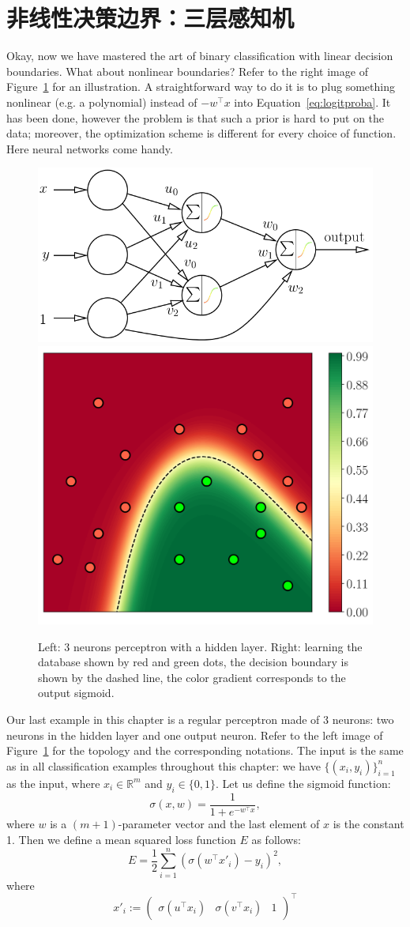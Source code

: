 \documentclass[notitlepage,oneside]{book}
\begin{document}
\section{非线性决策边界：三层感知机}
\label{sec:NN}
Okay, now we have mastered the art of binary classification with linear decision boundaries.
What about nonlinear boundaries? Refer to the right image of Figure~\ref{fig:neural} for an illustration.
A straightforward way to do it is to plug something nonlinear (e.g. a polynomial) instead of $-w^\top x$ into Equation~\eqref{eq:logitproba}.
It has been done, however the problem is that such a prior is hard to put on the data; moreover, the optimization scheme is different for every choice of function.
Here neural networks come handy.

\begin{figure}[t]
    \centering
    \includegraphics[width=.55\linewidth]{img/3neurons.png}
    \quad
    \includegraphics[width=.4\linewidth]{img/neural.png}
    \caption{Left: 3 neurons perceptron with a hidden layer. Right: learning the database shown by red and green dots, the decision boundary is shown by the dashed line, the color gradient corresponds to the output sigmoid.}
    \label{fig:neural}
\end{figure}

Our last example in this chapter is a regular perceptron made of 3 neurons: two neurons in the hidden layer and one output neuron.
Refer to the left image of Figure~\ref{fig:neural} for the topology and the corresponding notations.
The input is the same as in all classification examples throughout this chapter: we have $\{(x_i, y_i)\}_{i=1}^n$ as the input, where $x_i\in\mathbb R^m$ and $y_i\in \{0,1\}$.
Let us define the sigmoid function:
$$
\sigma(x,w) = \frac{1}{1+e^{-w^\top x}},
$$
where $w$ is a $(m+1)$-parameter vector and the last element of $x$ is the constant 1.
Then we define a mean squared loss function $E$ as follows:
$$
E = \frac{1}{2}\sum_{i=1}^{n} \left(\sigma\left(w^\top x'_i\right) - y_i\right)^2,
$$
where
$$
x'_i :=  \begin{pmatrix} \sigma(u^\top x_i) &  \sigma(v^\top x_i) & 1\end{pmatrix}^\top
$$
\end{document}
